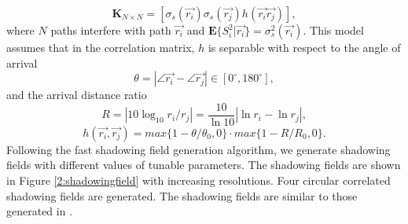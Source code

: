 \begin{equation}
\mathbf{K}_{N\times N} = [ \sigma_{s}(\vec{r_{i}})\sigma_{s}(\vec{r_{j}})h(\vec{r_{i}}\vec{r_{j}})],
\label{correlationmatrix}
\end{equation}
where $N$ paths interfere with path $\vec{r_{i}}$ and $\mathbf{E}\{S_{i}^{2}|\vec{r_{i}}\}=\sigma_{s}^{2}(\vec{r_{i}})$. This model assumes that in the correlation matrix, $h$ is separable with respect to the angle of arrival
\begin{equation}
\theta = |\angle\vec{r_{i}}-\angle\vec{r_{j}}|\in [0^{\circ},180^{\circ}],
\end{equation}
and the arrival distance ratio
\begin{equation}
R=|10\log_{10}r_{i}/r_{j}|=\frac{10}{\ln 10}|\ln r_{i}-\ln r_{j}|,
\end{equation}
\begin{equation}
h(\vec{r_{i}},\vec{r_{j}})=max\{1-\theta/\theta_{0},0\}\cdot max\{1-R/R_{0},0\}.
\end{equation}
Following the fast shadowing field generation algorithm, we generate shadowing fields with different values of tunable parameters. The shadowing fields are shown in Figure \ref{2:shadowingfield} with increasing resolutions. Four circular correlated shadowing fields are generated.
The shadowing fields are similar to those generated in \cite{szyszkowicz2011interference}.
